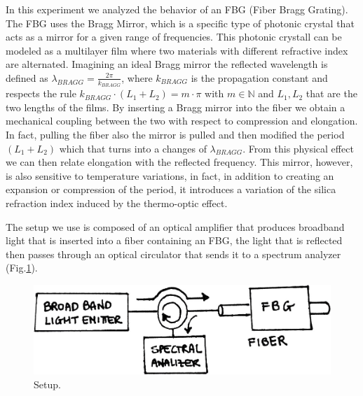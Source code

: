 
In this experiment we analyzed the behavior of an FBG (Fiber Bragg Grating). The FBG uses the Bragg Mirror, which is a specific type of photonic crystal that acts as a mirror for a given range of frequencies. This photonic crystall can be modeled as a multilayer film where two materials with different refractive index are alternated. Imagining an ideal Bragg mirror the reflected wavelength is defined as $\lambda_{BRAGG} = \frac{2\pi}{k_{BRAGG}}$, where $k_{BRAGG}$ is the propagation constant and respects the rule $k_{BRAGG} \cdot (L_1 + L_2) = m \cdot \pi$ with $m \in \mathbb{N}$ and $L_1, L_2$ that are the two lengths of the films. By inserting a Bragg mirror into the fiber we obtain a mechanical coupling between the two with respect to compression and elongation. In fact, pulling the fiber also the mirror is pulled and then modified the period $(L_1 + L_2)$ which that turns into a changes of $\lambda_{BRAGG}$. From this physical effect we can then relate elongation with the reflected frequency. This mirror, however, is also sensitive to temperature variations, in fact, in addition to creating an expansion or compression of the period, it introduces a variation of the silica refraction index induced by the thermo-optic effect.

The setup we use is composed of an optical amplifier that produces broadband light that is inserted into a fiber containing an FBG, the light that is reflected then passes through an optical circulator that sends it to a spectrum analyzer (Fig.\ref{fig:setup}).
\begin{figure}[h]
    \centering
    \includegraphics[scale=0.3]{img/setup.jpg}
    \caption{Setup.}
    \label{fig:setup}
\end{figure}


